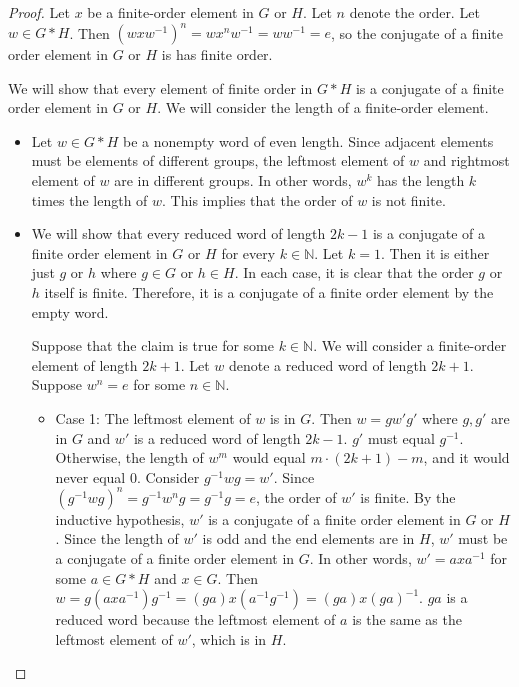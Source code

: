 \documentclass[12pt, psamsfonts]{amsart}
\theoremstyle{definition}
\theoremstyle{remark}
\numberwithin{equation}{section}
\begin{document}
\begin{proof}
  Let $x$ be a finite-order element in $G$ or $H$.
  Let $n$ denote the order.
  Let $w \in G * H$.
  Then $(wxw^{-1})^n = wx^nw^{-1} = ww^{-1} = e$, so the conjugate of a finite order element in $G$ or $H$ is has finite order.

  We will show that every element of finite order in $G * H$ is a conjugate of a finite order element in $G$ or $H$.
  We will consider the length of a finite-order element.
  \begin{itemize}
    \item
      Let $w \in G * H$ be a nonempty word of even length.
      Since adjacent elements must be elements of different groups, the leftmost element of $w$ and rightmost element of $w$ are in different groups.
      In other words, $w^k$ has the length $k$ times the length of $w$.
      This implies that the order of $w$ is not finite.
    \item
      We will show that every reduced word of length $2k - 1$ is a conjugate of a finite order element in $G$ or $H$ for every $k \in \mathbb{N}$.
      Let $k = 1$.
      Then it is either just $g$ or $h$ where $g \in G$ or $h \in H$.
      In each case, it is clear that the order $g$ or $h$ itself is finite.
      Therefore, it is a conjugate of a finite order element by the empty word.

      Suppose that the claim is true for some $k \in \mathbb{N}$.
      We will consider a finite-order element of length $2k + 1$.
      Let $w$ denote a reduced word of length $2k + 1$.
      Suppose $w^n = e$ for some $n \in \mathbb{N}$.
      \begin{itemize}
        \item
          Case 1: The leftmost element of $w$ is in $G$.
          Then $w = gw'g'$ where $g, g'$ are in $G$ and $w'$ is a reduced word of length $2k - 1$.
          $g'$ must equal $g^{-1}$.
          Otherwise, the length of $w^m$ would equal $m \cdot (2k + 1) - m$, and it would never equal 0.
          Consider $g^{-1}wg = w'$.
          Since $(g^{-1}wg)^n = g^{-1}w^ng = g^{-1}g = e$, the order of $w'$ is finite.
          By the inductive hypothesis, $w'$ is a conjugate of a finite order element in $G$ or $H$.
          Since the length of $w'$ is odd and the end elements are in $H$, $w'$ must be a conjugate of a finite order element in $G$.
          In other words, $w' = axa^{-1}$ for some $a \in G * H$ and $x \in G$.
          Then $w = g(axa^{-1})g^{-1} = (ga)x(a^{-1}g^{-1}) = (ga)x(ga)^{-1}$.
          $ga$ is a reduced word because the leftmost element of $a$ is the same as the leftmost element of $w'$, which is in $H$.


\end{itemize}
\end{itemize}
\end{proof}
\end{document}

